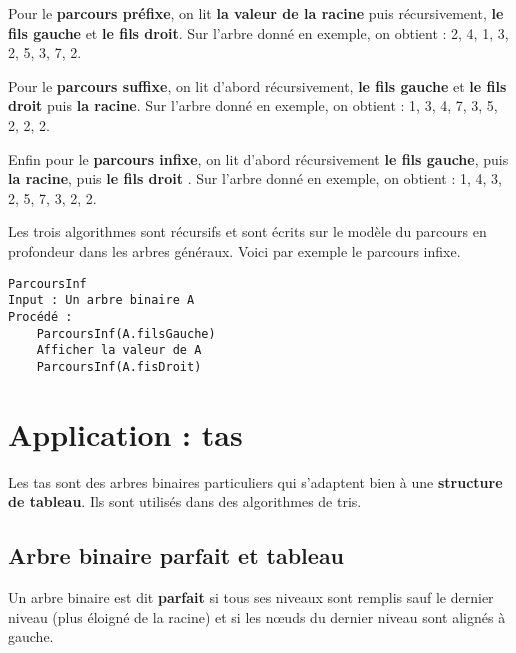 \documentclass{../cours}
\begin{document}
\begin{Example}
{}


Pour le \textbf{parcours préfixe}, on lit \textbf{la valeur de la racine} puis récursivement, \textbf{le fils gauche} et \textbf{le fils droit}. Sur l'arbre donné en exemple, on obtient : 2, 4, 1, 3, 2, 5, 3, 7, 2. 

Pour le \textbf{parcours suffixe}, on lit d'abord récursivement, \textbf{le fils gauche} et \textbf{le fils droit} puis \textbf{la racine}. Sur l'arbre donné en exemple, on obtient : 1, 3, 4, 7, 3, 5, 2, 2, 2.

Enfin pour le \textbf{parcours infixe}, on lit d'abord récursivement \textbf{le fils gauche}, puis \textbf{la racine}, puis \textbf{le fils droit} . Sur l'arbre donné en exemple, on obtient : 1, 4, 3, 2, 5, 7, 3, 2, 2.

Les trois algorithmes sont récursifs et sont écrits sur le modèle du parcours en profondeur dans les arbres généraux. Voici par exemple le parcours infixe.

\begin{lstlisting}
ParcoursInf
Input : Un arbre binaire A
Procédé :
    ParcoursInf(A.filsGauche)
    Afficher la valeur de A
    ParcoursInf(A.fisDroit)
\end{lstlisting} 
\end{Example}

\section{Application : tas}

Les tas sont des arbres binaires particuliers qui s'adaptent bien à une \textbf{structure de tableau}. Ils sont utilisés dans des algorithmes de tris. 

\subsection{Arbre binaire parfait et tableau}

\begin{Definition}
Un arbre binaire est dit \textbf{parfait} si tous ses niveaux sont remplis sauf le dernier niveau (plus éloigné de la racine) et si les nœuds du dernier niveau sont alignés à gauche.
\end{Definition}
\end{document}
